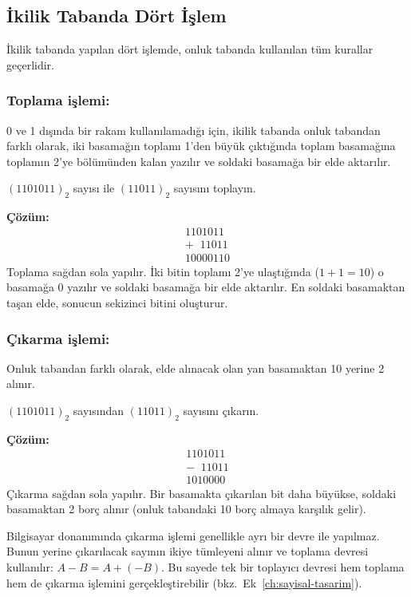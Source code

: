 \subsection{İkilik Tabanda Dört İşlem}

İkilik tabanda yapılan dört işlemde, onluk tabanda kullanılan tüm kurallar geçerlidir.

\subsubsection*{Toplama işlemi:} 0 ve 1 dışında bir rakam kullanılamadığı için, ikilik tabanda onluk tabandan farklı olarak, iki basamağın toplamı 1'den büyük çıktığında toplam basamağına toplamın 2'ye bölümünden kalan yazılır ve soldaki basamağa bir elde aktarılır.

\begin{ornek}[A.5]
$(1101011)_2$ sayısı ile $(11011)_2$ sayısını toplayın.

\textbf{Çözüm:}
\[
\begin{array}{r}
  1101011 \\
+ \;\; 11011 \\
\hline
10000110
\end{array}
\]
Toplama sağdan sola yapılır. İki bitin toplamı 2'ye ulaştığında ($1+1=10$) o basamağa 0 yazılır ve soldaki basamağa bir elde aktarılır. En soldaki basamaktan taşan elde, sonucun sekizinci bitini oluşturur.
\end{ornek}

\subsubsection*{Çıkarma işlemi:} Onluk tabandan farklı olarak, elde alınacak olan yan basamaktan 10 yerine 2 alınır.

\begin{ornek}[A.6]
$(1101011)_2$ sayısından $(11011)_2$ sayısını çıkarın.

\textbf{Çözüm:}
\[
\begin{array}{r}
1101011 \\
- \;\; 11011 \\
\hline
1010000
\end{array}
\]
Çıkarma sağdan sola yapılır. Bir basamakta çıkarılan bit daha büyükse, soldaki basamaktan 2 borç alınır (onluk tabandaki 10 borç almaya karşılık gelir).
\end{ornek}

Bilgisayar donanımında çıkarma işlemi genellikle ayrı bir devre ile yapılmaz. Bunun yerine çıkarılacak sayının ikiye tümleyeni alınır ve toplama devresi kullanılır: $A - B = A + (-B)$. Bu sayede tek bir toplayıcı devresi hem toplama hem de çıkarma işlemini gerçekleştirebilir (bkz.\ Ek~\ref{ch:sayisal-tasarim}).

